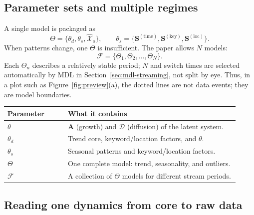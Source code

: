 \subsection{Parameter sets and multiple regimes}

A single model is packaged as
\[
  \Theta=\{\theta_d,\theta_s,\widehat{\mathcal{X}}_o\},
  \qquad
  \theta_s=\{\mathbf{S}^{(\mathrm{time})},\mathbf{S}^{(\mathrm{key})},
             \mathbf{S}^{(\mathrm{loc})}\}.
\]
When patterns change, one $\Theta$ is insufficient. The paper allows $N$ models:
\[
  \mathcal{F}=\{\Theta_1,\Theta_2,\ldots,\Theta_N\}.
\]
Each $\Theta_n$ describes a relatively stable period; $N$ and switch times are selected automatically
by MDL in Section~\ref{sec:mdl-streaming}, not split by eye. Thus, in a plot such as
Figure~\ref{fig:preview}(a), the dotted lines are not data events; they are model boundaries.

\begin{center}
\small
\begin{tabular}{@{}p{0.24\linewidth}p{0.68\linewidth}@{}}
  \toprule
  Parameter & What it contains \\
  \midrule
  $\theta$ & $\mathbf{A}$ (growth) and $\mathcal{D}$ (diffusion) of the latent system. \\
  $\theta_d$ & Trend core, keyword/location factors, and $\theta$. \\
  $\theta_s$ & Seasonal patterns and keyword/location factors. \\
  $\Theta$ & One complete model: trend, seasonality, and outliers. \\
  $\mathcal{F}$ & A collection of $\Theta$ models for different stream periods. \\
  \bottomrule
\end{tabular}
\end{center}

\subsection{Reading one dynamics from core to raw data}

